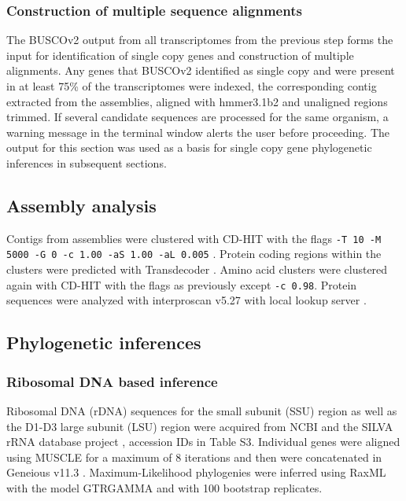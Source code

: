 \documentclass[fleqn,10pt,lineno]{wlpeerj} %
\begin{document}
\subsubsection*{Construction of multiple sequence alignments}
The BUSCOv2 output from all transcriptomes from the previous step forms the input for identification of single copy genes and construction of multiple alignments. 
Any genes that BUSCOv2 identified as single copy and were present in at least 75\% of the transcriptomes were indexed, the corresponding contig extracted from the assemblies, aligned with hmmer3.1b2 \cite{eddy2015hmmer} and unaligned regions trimmed.
If several candidate sequences are processed for the same organism, a warning message in the terminal window alerts the user before proceeding. 
The output for this section was used as a basis for single copy gene phylogenetic inferences in subsequent sections.

\subsection*{Assembly analysis}
Contigs from assemblies were clustered with CD-HIT with the flags \texttt{-T 10 -M 5000 -G 0 -c 1.00 -aS 1.00 -aL 0.005} \cite{fu2012cd}. 
Protein coding regions within the clusters were predicted with Transdecoder \cite{haas2016transdecoder}. 
Amino acid clusters were clustered again with CD-HIT with the flags as previously except \texttt{-c 0.98}.
Protein sequences were analyzed with interproscan v5.27 with local lookup server \cite{quevillon2005interproscan}.

\subsection*{Phylogenetic inferences}
\subsubsection*{Ribosomal DNA based inference}
Ribosomal DNA (rDNA) sequences for the small subunit (SSU) region as well as the D1-D3 large subunit (LSU) region were acquired from NCBI \cite{coordinators2017database} and the SILVA rRNA database project \cite{silvaproj}, accession IDs in Table S3. 
Individual genes were aligned using MUSCLE \cite{edgar2004muscle} for a maximum of 8 iterations and then were concatenated in Geneious v11.3 \cite{kearse2012geneious}.
Maximum-Likelihood phylogenies were inferred using RaxML \cite{stamatakis2014raxml} with the model GTRGAMMA and with 100 bootstrap replicates.
\end{document}
